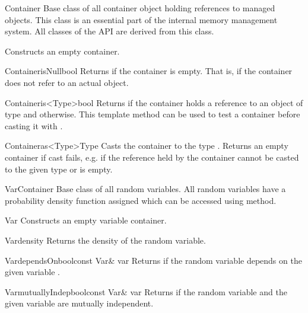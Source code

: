 \documentclass[a4paper, 10pt]{paper}
\begin{document}
\begin{defclass}{Container}
Base class of all container object holding references to managed objects. This class is an essential part of the internal memory 
management system. All classes of the API are derived from this class.

\begin{classsyn}{}
Constructs an empty container.
\end{classsyn}

\begin{defmeth}{Container}{isNull}{bool}{}
Returns  if the container is empty. That is, if the container does not refer to an actual object.
\end{defmeth}

\begin{defmeth}{Container}{is<Type>}{bool}{}
Returns  if the container holds a reference to an object of type  and  otherwise. 
This template method can be used to test a container before casting it with .
\end{defmeth}

\begin{defmeth}{Container}{as<Type>}{Type}{}
Casts the container to the type . Returns an empty container if cast fails, e.g. if the reference held by the 
container cannot be casted to the given type or is empty.
\end{defmeth}
\end{defclass}


\begin{defclassex}{Var}{Container}
Base class of all random variables. All random variables have a probability density function assigned which can be accessed
using  method.

\begin{classsyn}{Var}{} 
Constructs an empty variable container.
\end{classsyn}

\begin{defmeth}{Var}{density}{}{}
Returns the density of the random variable.
\end{defmeth}

\begin{defmeth}{Var}{dependsOn}{bool}{const Var\& var}
Returns  if the random variable depends on the given variable .
\end{defmeth}

\begin{defmeth}{Var}{mutuallyIndep}{bool}{const Var\& var}
Returns  if the random variable and the given variable are mutually independent.
\end{defmeth}
\end{defclassex}
\end{document}
